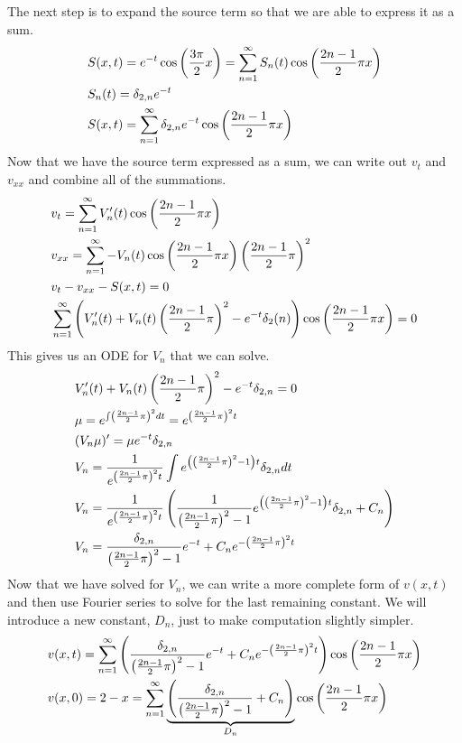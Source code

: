 \documentclass[11pt, fleqn]{article}
\begin{document}
The next step is to expand the source term so that we are able to express it as a sum.
\begin{align*}
    &S(x,t)=e^{-t}\cos\left( \frac{3\pi}{2}x \right)=\sum_{n=1}^\infty S_n(t)\cos\left( \frac{2n-1}{2}\pi x \right)\\
    &S_n(t)=\delta_{2,n}e^{-t}\\
    &S(x,t)=\sum_{n=1}^\infty \delta_{2,n}e^{-t}\cos\left( \frac{2n-1}{2}\pi x \right)
\end{align*}
Now that we have the source term expressed as a sum, we can write out $v_t$ and $v_{xx}$ and combine all of the summations.
\begin{align*}
    &v_t=\sum_{n=1}^\infty V_n'(t)\cos\left( \frac{2n-1}{2}\pi x \right)\\
    &v_{xx}=\sum_{n=1}^\infty -V_n(t)\cos\left( \frac{2n-1}{2}\pi x \right)\left( \frac{2n-1}{2}\pi \right)^2\\
    &v_t-v_{xx}-S(x,t)=0\\
    &\sum_{n=1}^\infty\left( V_n'(t)+V_n(t)\left( \frac{2n-1}{2}\pi \right)^2-e^{-t}\delta_2(n) \right)\cos\left( \frac{2n-1}{2}\pi x \right)=0
\end{align*}
This gives us an ODE for $V_n$ that we can solve.
\begin{align*}
    &V_n'(t)+V_n(t)\left( \frac{2n-1}{2}\pi \right)^2-e^{-t}\delta_{2,n}=0\\
    &\mu=e^{\int \left( \frac{2n-1}{2}\pi \right)^2dt}=e^{\left( \frac{2n-1}{2}\pi \right)^2 t}\\
    &(V_n\mu)'=\mu e^{-t}\delta_{2,n}\\
    &V_n=\frac{1}{e^{\left( \frac{2n-1}{2}\pi \right)^2 t}}\int e^{\left( \left( \frac{2n-1}{2}\pi \right)^2-1 \right)t}\delta_{2,n}dt\\
    &V_n=\frac{1}{e^{\left( \frac{2n-1}{2}\pi \right)^2 t}}\left( \frac{1}{\left( \frac{2n-1}{2}\pi \right)^2-1}e^{\left( \left( \frac{2n-1}{2}\pi \right)^2-1 \right)t}\delta_{2,n}+C_n \right)\\
    &V_n=\frac{\delta_{2,n}}{\left( \frac{2n-1}{2}\pi \right)^2-1}e^{-t}+C_ne^{-\left( \frac{2n-1}{2}\pi \right)^2t}
\end{align*}
Now that we have solved for $V_n$, we can write a more complete form of $v(x,t)$ and then use Fourier series to solve for the last remaining constant. We will introduce a new constant, $D_n$, just to make computation slightly simpler.
\begin{align*}
    &v(x,t)=\sum_{n=1}^\infty\left( \frac{\delta_{2,n}}{\left( \frac{2n-1}{2}\pi \right)^2-1}e^{-t}+C_ne^{-\left( \frac{2n-1}{2}\pi \right)^2t} \right)\cos\left( \frac{2n-1}{2}\pi x \right)\\
    &v(x,0)=2-x=\sum_{n=1}^\infty\underbrace{\left( \frac{\delta_{2,n}}{\left( \frac{2n-1}{2}\pi \right)^2-1}+C_n \right)}_{D_n}\cos\left( \frac{2n-1}{2}\pi x \right)
\end{align*}
\end{document}
